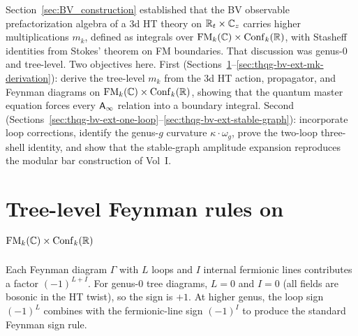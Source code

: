 \begin{summary}
Section~\ref{sec:BV_construction} established that the BV observable
prefactorization algebra of a 3d HT theory on $\mathbb{R}_t \times \mathbb{C}_z$
carries higher multiplications $m_k$, defined as integrals over
$\operatorname{FM}_k(\mathbb{C}) \times \operatorname{Conf}_k(\mathbb{R})$, with Stasheff identities from
Stokes' theorem on FM boundaries. That discussion
was genus-$0$ and tree-level. Two objectives here.
First (Sections~\ref{sec:thqg-bv-ext-tree-feynman}--\ref{sec:thqg-bv-ext-mk-derivation}):
derive the tree-level $m_k$ from the 3d HT action, propagator,
and Feynman diagrams on $\operatorname{FM}_k(\mathbb{C}) \times \operatorname{Conf}_k(\mathbb{R})$, showing
that the quantum master equation forces every $\mathsf{A}_{\infty}$ relation
into a boundary integral. Second
(Sections~\ref{sec:thqg-bv-ext-one-loop}--\ref{sec:thqg-bv-ext-stable-graph}):
incorporate loop corrections, identify the genus-$g$ curvature
$\kappa \cdot \omega_g$, prove the two-loop three-shell identity,
and show that the stable-graph amplitude expansion
reproduces the modular bar construction of Vol~I.
\end{summary}



\section{Tree-level Feynman rules on
\texorpdfstring{$\operatorname{FM}_k(\mathbb{C}) \times \operatorname{Conf}_k(\mathbb{R})$}{FM\_k(C) x Conf\_k(R)}}
\label{sec:thqg-bv-ext-tree-feynman}
\begin{convention}
Each Feynman diagram $\Gamma$ with $L$ loops and $I$ internal
fermionic lines contributes a factor $(-1)^{L+I}$. For
genus-$0$ tree diagrams, $L = 0$ and $I = 0$ (all fields
are bosonic in the HT twist), so the sign is $+1$. At higher
genus, the loop sign $(-1)^L$ combines with the fermionic-line
sign $(-1)^I$ to produce the standard Feynman sign rule.
\end{convention}

